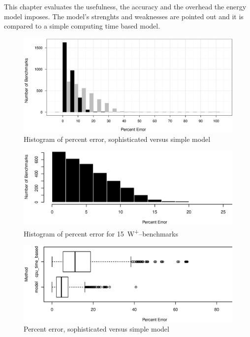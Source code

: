 \label{sec:evaluation}

This chapter evaluates the usefulness, the accuracy and the overhead the energy
model imposes. The model's strenghts and weaknesses are pointed out and it is
compared to a simple computing time based model.


\label{sec:error}

\begin{figure}
  \centering
    \includegraphics[width=\textwidth]{fig/hist-models.eps}
  \caption{Histogram of percent error, sophisticated versus simple model}
  \label{fig:err-hist}
\end{figure}

\begin{figure}
  \centering
    \includegraphics[width=\textwidth]{fig/hist-model-15W.eps}
  \caption{Histogram of percent error for \SI{15}{\watt}\textsuperscript{+}--benchmarks}
  \label{fig:err-hist-15}
\end{figure}

\begin{figure}
  \centering
    \includegraphics[width=\textwidth]{fig/Ncpu-bench-errs.eps}
  \caption{Percent error, sophisticated versus simple model}
  \label{fig:errs-ncpu}
\end{figure}

